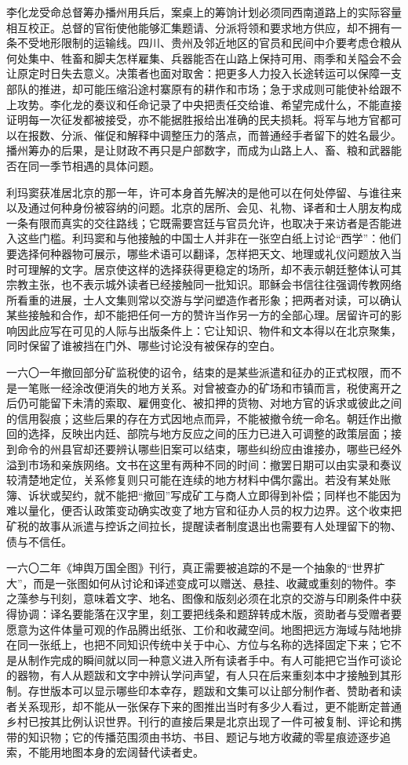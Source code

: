 李化龙受命总督筹办播州用兵后，案桌上的筹饷计划必须同西南道路上的实际容量相互校正。总督的官衔使他能够汇集题请、分派将领和要求地方供应，却不拥有一条不受地形限制的运输线。四川、贵州及邻近地区的官员和民间中介要考虑仓粮从何处集中、牲畜和脚夫怎样雇集、兵器能否在山路上保持可用、雨季和关隘会不会让原定时日失去意义。决策者也面对取舍：把更多人力投入长途转运可以保障一支部队的推进，却可能压缩沿途村寨原有的耕作和市场；急于求成则可能使补给跟不上攻势。李化龙的奏议和任命记录了中央把责任交给谁、希望完成什么，不能直接证明每一次征发都被接受，亦不能据胜报给出准确的民夫损耗。将军与地方官都可以在报数、分派、催促和解释中调整压力的落点，而普通经手者留下的姓名最少。播州筹办的后果，是让财政不再只是户部数字，而成为山路上人、畜、粮和武器能否在同一季节相遇的具体问题。

利玛窦获准居北京的那一年，许可本身首先解决的是他可以在何处停留、与谁往来以及通过何种身份被容纳的问题。北京的居所、会见、礼物、译者和士人朋友构成一条有限而真实的交往路线；它既需要宫廷与官员允许，也取决于来访者是否能进入这些门槛。利玛窦和与他接触的中国士人并非在一张空白纸上讨论“西学”：他们要选择何种器物可展示，哪些术语可以翻译，怎样把天文、地理或礼仪问题放入当时可理解的文字。居京使这样的选择获得更稳定的场所，却不表示朝廷整体认可其宗教主张，也不表示城外读者已经接触同一批知识。耶稣会书信往往强调传教网络所看重的进展，士人文集则常以交游与学问塑造作者形象；把两者对读，可以确认某些接触和合作，却不能把任何一方的赞许当作另一方的全部心理。居留许可的影响因此应写在可见的人际与出版条件上：它让知识、物件和文本得以在北京聚集，同时保留了谁被挡在门外、哪些讨论没有被保存的空白。

一六〇一年撤回部分矿监税使的诏令，结束的是某些派遣和征办的正式权限，而不是一笔账一经涂改便消失的地方关系。对曾被查办的矿场和市镇而言，税使离开之后仍可能留下未清的索取、雇佣变化、被扣押的货物、对地方官的诉求或彼此之间的信用裂痕；这些后果的存在方式因地点而异，不能被撤令统一命名。朝廷作出撤回的选择，反映出内廷、部院与地方反应之间的压力已进入可调整的政策层面；接到命令的州县官却还要辨认哪些旧案可以结束，哪些纠纷应由谁接办，哪些已经外溢到市场和亲族网络。文书在这里有两种不同的时间：撤罢日期可以由实录和奏议较清楚地定位，关系修复则只可能在连续的地方材料中偶尔露出。若没有某处账簿、诉状或契约，就不能把“撤回”写成矿工与商人立即得到补偿；同样也不能因为难以量化，便否认政策变动确实改变了地方官和征办人员的权力边界。这个收束把矿税的故事从派遣与控诉之间拉长，提醒读者制度退出也需要有人处理留下的物、债与不信任。

一六〇二年《坤舆万国全图》刊行，真正需要被追踪的不是一个抽象的“世界扩大”，而是一张图如何从讨论和译述变成可以赠送、悬挂、收藏或重刻的物件。李之藻参与刊刻，意味着文字、地名、图像和版刻必须在北京的交游与印刷条件中获得协调：译名要能落在汉字里，刻工要把线条和题辞转成木版，资助者与受赠者要愿意为这件体量可观的作品腾出纸张、工价和收藏空间。地图把远方海域与陆地排在同一张纸上，也把不同知识传统中关于中心、方位与名称的选择固定下来；它不是从制作完成的瞬间就以同一种意义进入所有读者手中。有人可能把它当作可谈论的器物，有人从题跋和文字中辨认学问声望，有人只在后来重刻本中才接触到其形制。存世版本可以显示哪些印本幸存，题跋和文集可以让部分制作者、赞助者和读者关系现形，却不能从一张保存下来的图推出当时有多少人看过，更不能断定普通乡村已按其比例认识世界。刊行的直接后果是北京出现了一件可被复制、评论和携带的知识物；它的传播范围须由书坊、书目、题记与地方收藏的零星痕迹逐步追索，不能用地图本身的宏阔替代读者史。

